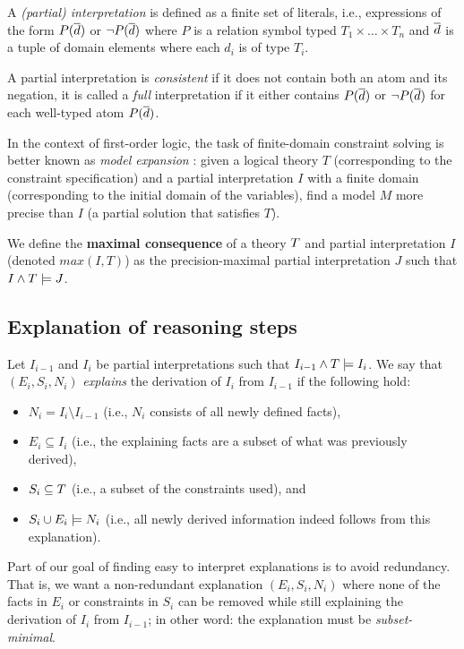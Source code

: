A \emph{(partial) interpretation} is defined as a finite set of literals, i.e., expressions of the form $P(\overline{d})$ or $\lnot P(\overline{d})$ where $P$ is a relation symbol typed $T_1\times\dots \times T_n$ and $\overline{d}$ is a tuple of domain elements where each $d_i$ is of type $T_i$.

A partial interpretation is \emph{consistent} if it does not contain both an atom and its negation, it is called a \emph{full} interpretation if it either contains $P(\overline{d})$ or $\lnot P(\overline{d})$ for each well-typed atom $P(\overline{d})$. 

In the context of first-order logic, the task of finite-domain constraint solving is better known as \emph{model expansion} \cite{MitchellTHM06}: given a logical theory $T$ (corresponding to the constraint specification) and a partial interpretation $I$ with a finite domain (corresponding to the initial domain of the variables), find a model $M$ more precise than $I$ (a partial solution that satisfies $T$).

We define the \textbf{maximal consequence} of a theory $T$ and partial interpretation $I$ (denoted $max(I,T)$) as the precision-maximal partial interpretation $J$ such that  $I \wedge T \models J$.

\subsection{Explanation of reasoning steps}

Let $I_{i-1}$ and $I_i$ be partial interpretations such that $I_{i-1}\land T \models I_i$.
We say that $(E_i,S_i,N_i)$ \emph{explains} the derivation of $I_{i}$ from $I_{i-1}$ if the following hold:
\begin{itemize}
   \item $N_i= I_i \setminus I_{i-1}$ (i.e., $N_i$ consists of all newly defined facts), 
   \item $E_i\subseteq I_i$ (i.e., the explaining facts are a subset of what was previously derived),
   \item $S_i \subseteq T$ (i.e., a subset of the constraints used), and 
   \item $S_i \cup E_i \models N_i$ (i.e., all newly derived information indeed follows from this explanation).
\end{itemize}

Part of our goal of finding easy to interpret explanations is to avoid redundancy. 
That is, we want a non-redundant explanation $(E_i,S_i,N_i)$ where none of the facts in $E_i$ or constraints in $S_i$ can be removed while still explaining the derivation of $I_i$ from $I_{i-1}$; in other word: the explanation must be \textit{subset-minimal}.

